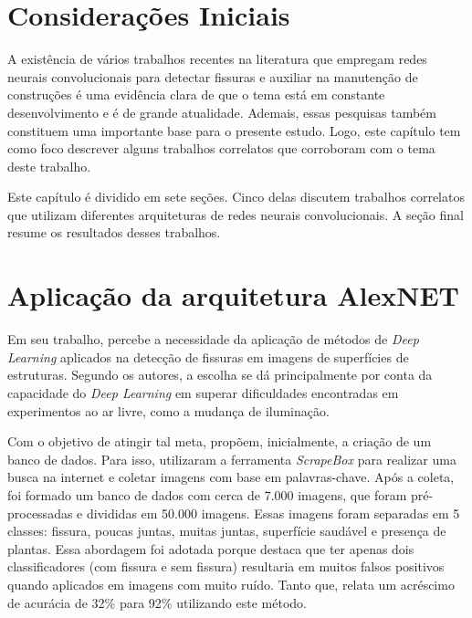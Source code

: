 
\section{Considerações Iniciais}

A existência de vários trabalhos recentes na literatura que empregam redes neurais convolucionais para detectar fissuras e auxiliar na manutenção de construções é uma evidência clara de que o tema está em constante desenvolvimento e é de grande atualidade. 
Ademais, essas pesquisas também constituem uma importante base para o presente estudo. 
Logo, este capítulo tem como foco descrever alguns trabalhos correlatos que corroboram com o tema deste trabalho.

Este capítulo é dividido em sete seções. 
Cinco delas discutem trabalhos correlatos que utilizam diferentes arquiteturas de redes neurais convolucionais. 
A seção final resume os resultados desses trabalhos.



\section{Aplicação da arquitetura AlexNET}

Em seu trabalho,  percebe a necessidade da aplicação de métodos de \textit{Deep Learning} aplicados na detecção de fissuras em imagens de superfícies de estruturas.
Segundo os autores, a escolha se dá principalmente por conta da capacidade do \textit{Deep Learning} em superar dificuldades encontradas em experimentos ao ar livre, como a mudança de iluminação.

Com o objetivo de atingir tal meta,  propõem, inicialmente, a criação de um banco de dados. 
Para isso, utilizaram a ferramenta \textit{ScrapeBox} para realizar uma busca na internet e coletar imagens com base em palavras-chave. 
Após a coleta, foi formado um banco de dados com cerca de 7.000 imagens, que foram pré-processadas e divididas em 50.000 imagens. 
Essas imagens foram separadas em 5 classes: fissura,  poucas juntas, muitas juntas, superfície saudável e presença de plantas. 
Essa abordagem foi adotada porque  destaca que ter apenas dois classificadores (com fissura e sem fissura) resultaria em muitos falsos positivos quando aplicados em imagens com muito ruído.
Tanto que,  relata um acréscimo de acurácia de 32\% para 92\% utilizando este método.

